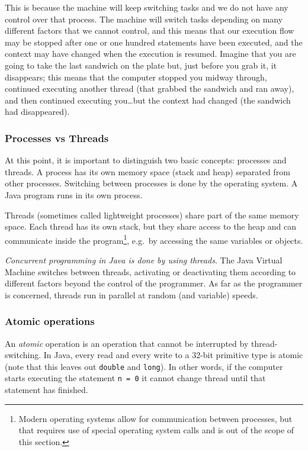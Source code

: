 This is because the machine will keep switching tasks and we do not
have any control over that process. The machine will switch tasks
depending on many different factors that we cannot control, and this
means that our execution flow may be stopped after one or one hundred
statements have been executed, and the context may have changed when
the execution is resumed. Imagine that you are going to take the last
sandwich on the plate but, just before you grab it, it disappears;
this means that the computer stopped you midway through, continued
executing another thread (that grabbed the sandwich and ran away), and
then continued executing you\ldots but the context had changed (the
sandwich had disappeared). 

\subsubsection{Processes vs Threads}
\label{sec:processes-vs-threads}

At this point, it is important to distinguish two basic concepts:
processes and threads. A process has its own memory space (stack and
heap) separated from other processes. Switching between processes is
done by the operating system. A Java program runs in its own process. 

Threads (sometimes called lightweight processes) share part of the
same memory space. Each thread has its own stack, but they share
access to the heap and can communicate inside the
program\footnote{Modern operating systems allow for communication
  between processes, but that requires use of special operating system
  calls and is out of the scope of this section.}, e.g.~by accessing
the same variables or objects. 

\emph{Concurrent programming in Java is done by using threads}. The Java
Virtual Machine switches between threads, activating or deactivating
them according to different factors beyond the control of the
programmer. As far as the programmer is concerned, threads run in
parallel at random (and variable) speeds. 

\subsubsection{Atomic operations}
\label{sec:atomic-operations}

An \emph{atomic} operation is an operation that cannot be interrupted
by thread-switching. In Java, every read and every write to a 32-bit
primitive type is atomic (note that this leaves out \verb+double+ and
\verb+long+). In other words, if the computer starts executing the
statement \verb+n = 0+ it cannot change thread until that statement
has finished.

